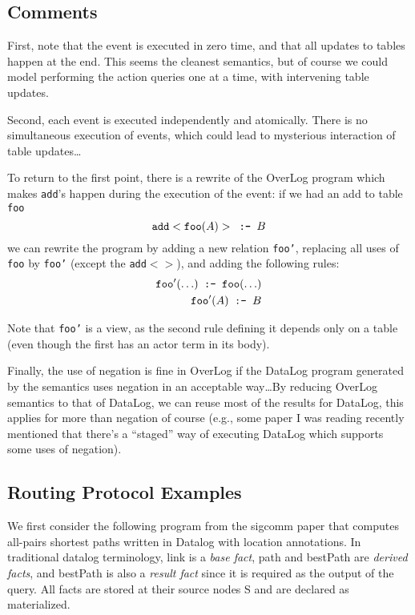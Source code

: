 \documentclass{article}
\newcommand{\code}[1]{{\tt \small #1}}
\newcommand{\imp}{\mbox{\tt \ :-\ }}
\begin{document}
\subsection{Comments}

First, note that the event is executed in zero time, and that all updates
to tables happen at the end. This seems the cleanest semantics, but of
course we could model performing the action queries one at a time, with
intervening table updates.  

Second, each event is executed independently and atomically. There is
no simultaneous execution of events, which could lead to mysterious
interaction of table updates\ldots

To return to the first point, there is a rewrite of the OverLog program
which makes \code{add}'s happen during the execution of the event: if 
we had an add to table \code{foo} \[
\code{add}<\code{foo}(A)> \imp B
\]
we can rewrite the program by adding a new relation \code{foo'}, replacing all uses of \code{foo} by
\code{foo'} (except the \code{add$<>$}), and adding the following rules:
\begin{eqnarray*}
\code{foo'}(\ldots) \imp \code{foo}(\ldots) \\
\code{foo'}(A) \imp B
\end{eqnarray*}

Note that \code{foo'} is a view, as the second rule defining it depends
only on a table (even though the first has an actor term in its body).

Finally, the use of negation is fine in OverLog if the DataLog program
generated by the semantics uses negation in an acceptable way\ldots By
reducing OverLog semantics to that of DataLog, we can reuse most of the
results for DataLog, this applies for more than negation of course (e.g.,
some paper I was reading recently mentioned that there's a ``staged'' way
of executing DataLog which supports some uses of negation).


\subsection{Routing Protocol Examples}
\label{sec:routing}

We first consider the following program from the sigcomm paper that computes all-pairs shortest
paths written in Datalog with location annotations. In traditional datalog terminology, link is a {\em base fact}, path and
bestPath are {\em derived facts}, and bestPath is also a {\em result
  fact} since it is required as the output of the query. All facts are
stored at their source nodes S and are declared as materialized.
\end{document}
